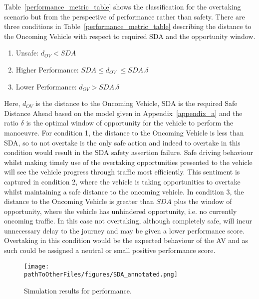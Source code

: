 Table~\ref{performance_metric_table} shows the classification for the overtaking scenario but from the perspective of performance rather than safety. There are three conditions in Table~\ref{performance_metric_table} describing the distance to the Oncoming Vehicle with respect to required SDA and the opportunity window. 
\begin{enumerate}[1)]
    \item Unsafe: $d_{OV} < SDA$
    \item Higher Performance: $SDA \leq d_{OV}$ $\leq SDA.\delta$
    \item Lower Performance: $d_{OV} > SDA.\delta$
\end{enumerate}
%
Here, $d_{OV}$ is the distance to the Oncoming Vehicle, SDA is the required Safe Distance Ahead based on the model given in Appendix~\ref{appendix_a} and the ratio $\delta$ is the optimal window of opportunity for the vehicle to perform the manoeuvre. For condition 1, the distance to the Oncoming Vehicle is less than SDA, so to not overtake is the only safe action and indeed to overtake in this condition would result in the SDA safety assertion failure. Safe driving behaviour whilst making timely use of the overtaking opportunities presented to the vehicle will see the vehicle progress through traffic most efficiently. This sentiment is captured in condition 2, where the vehicle is taking opportunities to overtake whilst maintaining a safe distance to the oncoming vehicle. In condition 3, the distance to the Oncoming Vehicle is greater than $SDA$ plus the window of opportunity, where the vehicle has unhindered opportunity, i.e. no currently oncoming traffic. In this case not overtaking, although completely safe, will incur unnecessary delay to the journey and may be given a lower performance score. Overtaking in this condition would be the expected behaviour of the AV and as such could be assigned a neutral or small positive performance score.

\begin{figure}[t]
    \centering
    \texttt{[image: \\pathToOtherFiles/figures/SDA\_annotated.png]}
    \caption{Simulation results for performance.}
    \label{fig:performance_results}
\end{figure}

